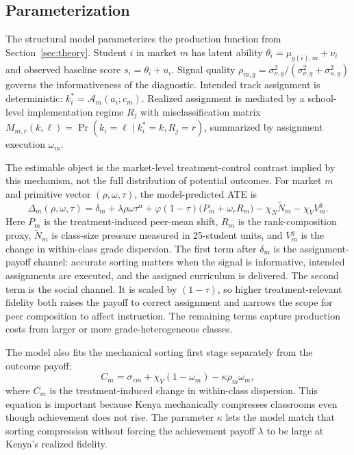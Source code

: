 \documentclass[11pt]{article}
\begin{document}
\subsection{Parameterization}
\label{subsec:struct_param}

The structural model parameterizes the production function from Section~\ref{sec:theory}. Student $i$ in market $m$ has latent ability $\theta_i = \mu_{g(i),m} + \nu_i$ and observed baseline score $s_i = \theta_i + u_i$. Signal quality $\rho_{m,g} = \sigma^2_{\nu,g}/(\sigma^2_{\nu,g} + \sigma^2_{u,g})$ governs the informativeness of the diagnostic. Intended track assignment is deterministic: $k_i^* = \mathcal{A}_m(a_i; c_m)$. Realized assignment is mediated by a school-level implementation regime $R_j$ with misclassification matrix $M_{m,r}(k,\ell) = \Pr(k_i = \ell \mid k_i^* = k, R_j = r)$, summarized by assignment execution $\omega_m$.

The estimable object is the market-level treatment-control contrast implied by this mechanism, not the full distribution of potential outcomes. For market $m$ and primitive vector $(\rho,\omega,\tau)$, the model-predicted ATE is
\begin{equation}
\label{eq:str_ate_map}
\Delta_m(\rho,\omega,\tau)
= \delta_m
+ \lambda \rho\omega\tau^\alpha
+ \varphi(1-\tau)\big(P_m+\omega_r R_m\big)
- \chi_N \widetilde{N}_m
- \chi_V V^g_m .
\end{equation}
Here $P_m$ is the treatment-induced peer-mean shift, $R_m$ is the rank-composition proxy, $\widetilde{N}_m$ is class-size pressure measured in 25-student units, and $V^g_m$ is the change in within-class grade dispersion. The first term after $\delta_m$ is the assignment-payoff channel: accurate sorting matters when the signal is informative, intended assignments are executed, and the assigned curriculum is delivered. The second term is the social channel. It is scaled by $(1-\tau)$, so higher treatment-relevant fidelity both raises the payoff to correct assignment and narrows the scope for peer composition to affect instruction. The remaining terms capture production costs from larger or more grade-heterogeneous classes.

The model also fits the mechanical sorting first stage separately from the outcome payoff:
\begin{equation}
\label{eq:str_dispersion_map}
C_m = \sigma_{\varepsilon m} + \chi_V(1-\omega_m) - \kappa\rho_m\omega_m,
\end{equation}
where $C_m$ is the treatment-induced change in within-class dispersion. This equation is important because Kenya mechanically compresses classrooms even though achievement does not rise. The parameter $\kappa$ lets the model match that sorting compression without forcing the achievement payoff $\lambda$ to be large at Kenya's realized fidelity.
\end{document}
